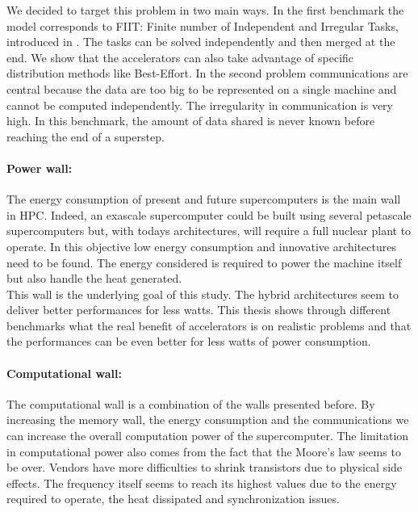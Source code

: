 We decided to target this problem in two main ways. 
In the first benchmark the model corresponds to FIIT: Finite number of Independent and Irregular Tasks, introduced in \cite{flauzac2003confiit}.
The tasks can be solved independently and then merged at the end. 
We show that the accelerators can also take advantage of specific distribution methods like Best-Effort. 
In the second problem communications are central because the data are too big to be represented on a single machine and cannot be computed independently. 
The irregularity in communication is very high.
In this benchmark, the amount of data shared is never known before reaching the end of a superstep.

\paragraph{Power wall: }
The energy consumption of present and future supercomputers is the main wall in HPC. 
Indeed, an exascale supercomputer could be built using several petascale supercomputers but, with todays architectures, will require a full nuclear plant to operate. 
In this objective low energy consumption and innovative architectures need to be found. 
The energy considered is required to power the machine itself but also handle the heat generated.\\

This wall is the underlying goal of this study. 
The hybrid architectures seem to deliver better performances for less watts.
This thesis shows through different benchmarks what the real benefit of accelerators is on realistic problems and that the performances can be even better for less watts of power consumption.

\paragraph{Computational wall: }
The computational wall is a combination of the walls presented before. 
By increasing the memory wall, the energy consumption and the communications we can increase the overall computation power of the supercomputer. 
The limitation in computational power also comes from the fact that the Moore's law seems to be over. 
Vendors have more difficulties to shrink transistors due to physical side effects. 
The frequency itself seems to reach its highest values due to the energy required to operate, the heat dissipated and synchronization issues.\\ 

